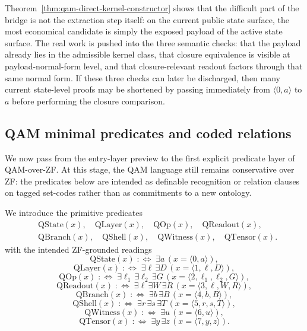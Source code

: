 \begin{remark}\label{rem:qam-direct-kernel-constructor-meaning}
Theorem~\ref{thm:qam-direct-kernel-constructor} shows that the difficult part of the bridge is not the extraction step itself: on the current public state surface, the most economical candidate is simply the exposed payload of the active state surface. The real work is pushed into the three semantic checks: that the payload already lies in the admissible kernel class, that closure equivalence is visible at payload-normal-form level, and that closure-relevant readout factors through that same normal form. If these three checks can later be discharged, then many current state-level proofs may be shortened by passing immediately from $\langle 0,a\rangle$ to $a$ before performing the closure comparison.
\end{remark}

\subsection*{QAM minimal predicates and coded relations}

We now pass from the entry-layer preview to the first explicit predicate layer of QAM-over-ZF. At this stage, the QAM language still remains conservative over ZF: the predicates below are intended as definable recognition or relation clauses on tagged set-codes rather than as commitments to a new ontology.

\begin{definition}
We introduce the primitive predicates
\[
\begin{aligned}
&\mathrm{QState}(x),\quad \mathrm{QLayer}(x),\quad \mathrm{QOp}(x),\quad \mathrm{QReadout}(x),\\[0.15em]
&\mathrm{QBranch}(x),\quad \mathrm{QShell}(x),\quad \mathrm{QWitness}(x),\quad \mathrm{QTensor}(x).
\end{aligned}
\]
with the intended ZF-grounded readings
\[
\mathrm{QState}(x)\;:\Longleftrightarrow\;\exists a\,(x=\langle 0,a\rangle),
\]
\[
\mathrm{QLayer}(x)\;:\Longleftrightarrow\;\exists \ell\,\exists D\,(x=\langle 1,\ell,D\rangle),
\]
\[
\mathrm{QOp}(x)\;:\Longleftrightarrow\;\exists \ell_1\,\exists \ell_2\,\exists G\,(x=\langle 2,\ell_1,\ell_2,G\rangle),
\]
\[
\mathrm{QReadout}(x)\;:\Longleftrightarrow\;\exists \ell\,\exists W\,\exists R\,(x=\langle 3,\ell,W,R\rangle),
\]
\[
\mathrm{QBranch}(x)\;:\Longleftrightarrow\;\exists b\,\exists B\,(x=\langle 4,b,B\rangle),
\]
\[
\mathrm{QShell}(x)\;:\Longleftrightarrow\;\exists r\,\exists s\,\exists T\,(x=\langle 5,r,s,T\rangle),
\]
\[
\mathrm{QWitness}(x)\;:\Longleftrightarrow\;\exists u\,(x=\langle 6,u\rangle),
\]
\[
\mathrm{QTensor}(x)\;:\Longleftrightarrow\;\exists y\,\exists z\,(x=\langle 7,y,z\rangle).
\]
\end{definition}

